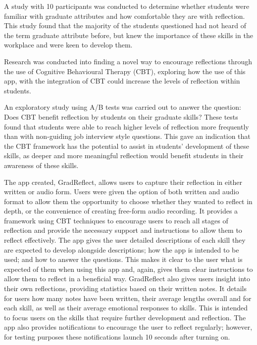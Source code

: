 \documentclass{l4proj}
\begin{document}
A study with 10 participants was conducted to determine whether students were familiar with graduate attributes and how comfortable they are with reflection. This study found that the majority of the students questioned had not heard of the term graduate attribute before, but knew the importance of these skills in the workplace and were keen to develop them.

Research was conducted into finding a novel way to encourage reflections through the use of Cognitive Behavioural Therapy (CBT), exploring how the use of this app, with the integration of CBT could increase the levels of reflection within students. 

An exploratory study using A/B tests was carried out to answer the question: Does CBT benefit reflection by students on their graduate skills? These tests found that students were able to reach higher levels of reflection more frequently than with non-guiding job interview style questions. This gave an indication that the CBT framework has the potential to assist in students’ development of these skills, as deeper and more meaningful reflection would benefit students in their awareness of these skills.

The app created, GradReflect, allows users to capture their reflection in either written or audio form. Users were given the option of both written and audio format to allow them the opportunity to choose whether they wanted to reflect in depth, or the convenience of creating free-form audio recording. It provides a framework using CBT techniques to encourage users to reach all stages of reflection and provide the necessary support and instructions to allow them to reflect effectively. The app gives the user detailed descriptions of each skill they are expected to develop alongside descriptions; how the app is intended to be used; and how to answer the questions. This makes it clear to the user what is expected of them when using this app and, again, gives them clear instructions to allow them to reflect in a beneficial way. GradReflect also gives users insight into their own reflections, providing statistics based on their written notes. It details for users how many notes have been written, their average lengths overall and for each skill, as well as their average emotional responses to skills. This is intended to focus users on the skills that require further development and reflection. The app also provides notifications to encourage the user to reflect regularly; however, for testing purposes these notifications launch 10 seconds after turning on.
\end{document}
